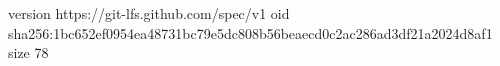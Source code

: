version https://git-lfs.github.com/spec/v1
oid sha256:1bc652ef0954ea48731bc79e5dc808b56beaecd0c2ac286ad3df21a2024d8af1
size 78
